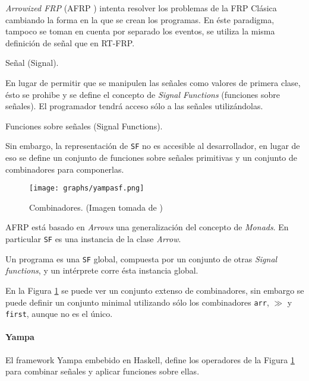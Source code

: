 
  \textit{Arrowized FRP} (AFRP
\cite{nilsson2002:arrows} \cite{hudak2002:arrows}) intenta
resolver los problemas de la FRP Clásica cambiando la forma
en la que se crean los programas.
  En éste paradigma, tampoco se toman en cuenta por separado los
eventos, se utiliza la misma definición de señal que en RT-FRP.

\begin{definicion}
  Señal (Signal).
\end{definicion}

  En lugar de permitir que se manipulen las señales como valores
de primera clase, ésto se prohibe y se define el concepto de
\textit{Signal Functions} (funciones sobre señales). El programador
tendrá acceso sólo a las señales utilizándolas.

\begin{definicion}
  Funciones sobre señales (Signal Functions).
\end{definicion}

  Sin embargo, la representación de \texttt{SF} no es accesible al
desarrollador, en lugar de eso se define un conjunto de funciones
sobre señales primitivas y un conjunto de combinadores
 para componerlas.

\begin{figure}[h]
\begin{center}
  \caption{Combinadores. (Imagen tomada de \cite{yampa})}
\texttt{[image: graphs/yampasf.png]}
\label{fig:arrowcombinators}
\end{center}
\end{figure}

  AFRP está basado en \textit{Arrows} \cite{hughes1998:arrows}
una generalización del concepto de \textit{Monads}. En particular
\texttt{SF} es una instancia de la clase \textit{Arrow}.

  Un programa es una \texttt{SF} global, compuesta por un conjunto
de otras \textit{Signal functions}, y un intérprete corre ésta instancia
global.

  En la Figura \ref{fig:arrowcombinators} se puede ver un conjunto
extenso de combinadores, sin embargo se
puede definir un conjunto minimal utilizando sólo
los combinadores \texttt{arr},
$\gg$ y \texttt{first}, aunque no es el único.

  \paragraph{Yampa}
  El framework Yampa \cite{yampa} embebido en Haskell, 
  define los operadores de la Figura \ref{fig:arrowcombinators}
  para combinar señales y aplicar funciones sobre ellas.


